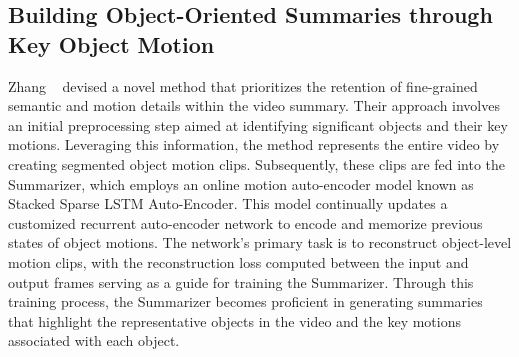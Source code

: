 \subsection{Building Object-Oriented Summaries through Key Object Motion}
\label{subsec:rel-unsup-object-oriented}

Zhang \etal~\cite{zhang2020unsupervised} devised a novel method that prioritizes the retention of fine-grained semantic and motion details within the video summary. Their approach involves an initial preprocessing step aimed at identifying significant objects and their key motions. Leveraging this information, the method represents the entire video by creating segmented object motion clips. Subsequently, these clips are fed into the Summarizer, which employs an online motion auto-encoder model known as Stacked Sparse LSTM Auto-Encoder. This model continually updates a customized recurrent auto-encoder network to encode and memorize previous states of object motions. The network's primary task is to reconstruct object-level motion clips, with the reconstruction loss computed between the input and output frames serving as a guide for training the Summarizer. Through this training process, the Summarizer becomes proficient in generating summaries that highlight the representative objects in the video and the key motions associated with each object.